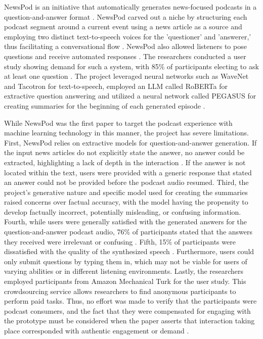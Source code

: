 \documentclass[12pt]{report}
\begin{document}
\begin{myfont}
        \indent NewsPod is an initiative that automatically generates news-focused podcasts in a question-and-answer format \citep{Laban2022NewsPod}. NewsPod carved out a niche by structuring each podcast segment around a current event using a news article as a source and employing two distinct text-to-speech voices for the 'questioner' and 'answerer,' thus facilitating a conversational flow \citep{Laban2022NewsPod}. NewsPod also allowed listeners to pose questions and receive automated responses \citep{Laban2022NewsPod}. The researchers conducted a user study showing demand for such a system, with 85\% of participants electing to ask at least one question \citep{Laban2022NewsPod}. The project leveraged neural networks such as WaveNet and Tacotron for text-to-speech, employed an LLM called RoBERTa for extractive question answering and utilized a neural network called PEGASUS for creating summaries for the beginning of each generated episode \citep{Laban2022NewsPod}.
        
        \indent While NewsPod was the first paper to target the podcast experience with machine learning technology in this manner, the project has severe limitations. First, NewsPod relies on extractive models for question-and-answer generation. If the input news articles do not explicitly state the answer, no answer could be extracted, highlighting a lack of depth in the interaction \citep{Laban2022NewsPod}. If the answer is not located within the text, users were provided with a generic response that stated an answer could not be provided before the podcast audio resumed. Third, the project's generative nature and specific model used for creating the summaries raised concerns over factual accuracy, with the model having the propensity to develop factually incorrect, potentially misleading, or confusing information. Fourth, while users were generally satisfied with the generated answers for the question-and-answer podcast audio, 76\% of participants stated that the answers they received were irrelevant or confusing \citep{Laban2022NewsPod}. Fifth, 15\% of participants were dissatisfied with the quality of the synthesized speech \citep{Laban2022NewsPod}. Furthermore, users could only submit questions by typing them in, which may not be viable for users of varying abilities or in different listening environments. Lastly, the researchers employed participants from Amazon Mechanical Turk for the user study. This crowdsourcing service allows researchers to find anonymous participants to perform paid tasks. Thus, no effort was made to verify that the participants were podcast consumers, and the fact that they were compensated for engaging with the prototype must be considered when the paper asserts that interaction taking place corresponded with authentic engagement or demand \citep{Laban2022NewsPod}.
        

\end{myfont}
\end{document}
